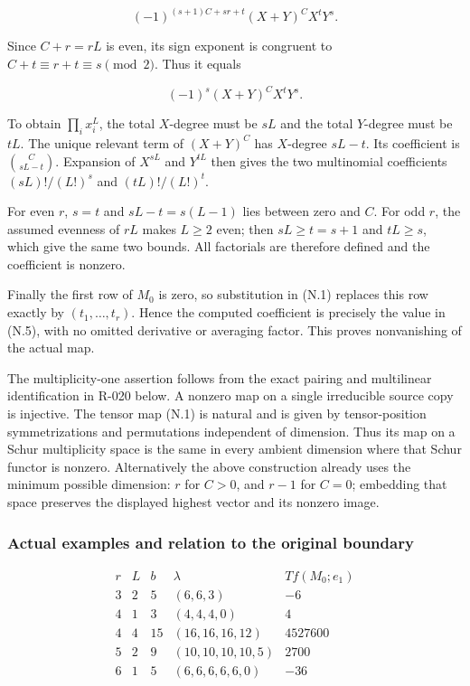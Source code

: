 \documentclass[
  10pt,
]{article}
\begin{document}
\[
(-1)^{(s+1)C+sr+t}(X+Y)^C X^tY^s.
\]

Since \(C+r=rL\) is even, its sign exponent is congruent to
\(C+t\equiv r+t\equiv s\pmod2\). Thus it equals

\[
(-1)^s(X+Y)^C X^tY^s.
\tag{N.8}
\]

To obtain \(\prod_i x_i^L\), the total \(X\)-degree must be \(sL\) and
the total \(Y\)-degree must be \(tL\). The unique relevant term of
\((X+Y)^C\) has \(X\)-degree \(sL-t\). Its coefficient is
\(\binom C{sL-t}\). Expansion of \(X^{sL}\) and \(Y^{tL}\) then gives
the two multinomial coefficients \((sL)!/(L!)^s\) and \((tL)!/(L!)^t\).

For even \(r\), \(s=t\) and \(sL-t=s(L-1)\) lies between zero and \(C\).
For odd \(r\), the assumed evenness of \(rL\) makes \(L\ge2\) even; then
\(sL\ge t=s+1\) and \(tL\ge s\), which give the same two bounds. All
factorials are therefore defined and the coefficient is nonzero.

Finally the first row of \(M_0\) is zero, so substitution in (N.1)
replaces this row exactly by \((t_1,\ldots,t_r)\). Hence the computed
coefficient is precisely the value in (N.5), with no omitted derivative
or averaging factor. This proves nonvanishing of the actual map.

The multiplicity-one assertion follows from the exact pairing and
multilinear identification in R-020 below. A nonzero map on a single
irreducible source copy is injective. The tensor map (N.1) is natural
and is given by tensor-position symmetrizations and permutations
independent of dimension. Thus its map on a Schur multiplicity space is
the same in every ambient dimension where that Schur functor is nonzero.
Alternatively the above construction already uses the minimum possible
dimension: \(r\) for \(C>0\), and \(r-1\) for \(C=0\); embedding that
space preserves the displayed highest vector and its nonzero image.

\subsubsection{Actual examples and relation to the original
boundary}\label{actual-examples-and-relation-to-the-original-boundary}

\[
\begin{array}{c|c|c|c|r}
r&L&b&\lambda&Tf(M_0;e_1)\\\hline
3&2&5&(6,6,3)&-6\\
4&1&3&(4,4,4,0)&4\\
4&4&15&(16,16,16,12)&4527600\\
5&2&9&(10,10,10,10,5)&2700\\
6&1&5&(6,6,6,6,6,0)&-36
\end{array}
\tag{N.9}
\]
\end{document}
